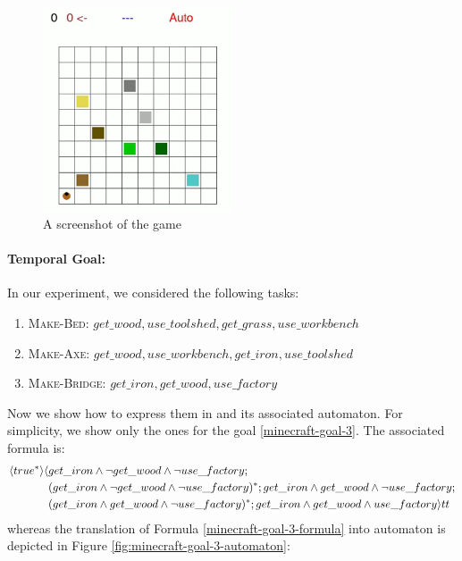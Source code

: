 \begin{figure}[h]
	\centering
	\includegraphics[width=0.5\textwidth]{images/minecraft-screenshot.png}
	\caption{A screenshot of the game \Minecraft}
	\label{fig:minecraft-screenshot}
\end{figure}

\paragraph{Temporal Goal:} In our experiment, we considered the following tasks:
\begin{enumerate}
	\item \textsc{Make-Bed}: $get\_wood, use\_toolshed, get\_grass, use\_workbench$\label{minecraft-goal-1}
	\item \textsc{Make-Axe}: $get\_wood, use\_workbench, get\_iron, use\_toolshed$\label{minecraft-goal-2}
	\item \textsc{Make-Bridge}: $get\_iron, get\_wood, use\_factory$\label{minecraft-goal-3}
\end{enumerate}
Now we show how to express them in \LDLf and its associated automaton. For simplicity, we show only the ones for the goal \ref{minecraft-goal-3}.
The associated \LDLf formula is:
\begin{align}\label{minecraft-goal-3-formula}
\langle true^* \rangle
\langle &get\_iron \wedge \lnot get\_wood \wedge \lnot use\_factory;\nonumber\\
	&
	(get\_iron \wedge \lnot get\_wood \wedge \lnot use\_factory)^*;
	get\_iron \wedge get\_wood \wedge \lnot use\_factory;\nonumber\\
	&(get\_iron \wedge  get\_wood \wedge\lnot use\_factory)^*;
	get\_iron \wedge  get\_wood \wedge  use\_factory \rangle tt
\end{align}
whereas the translation of Formula \ref{minecraft-goal-3-formula} into automaton is depicted in Figure \ref{fig:minecraft-goal-3-automaton}:

